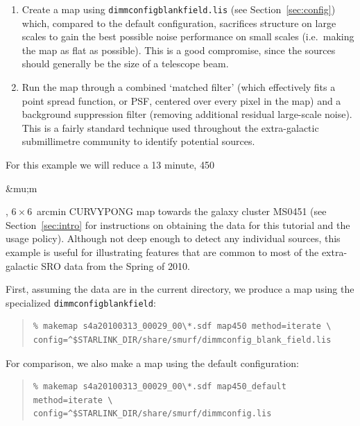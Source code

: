 \documentclass[twoside,11pt]{article}
\newcommand{\micron}{\mbox{\,${\umu}$m}}            %
\renewcommand{\_}{\texttt{\symbol{95}}}
\newenvironment{myquote}{\begin{quote}\begin{small}}{\end{small}\end{quote}}
\renewcommand{\micron}{\begin{rawhtml}&mu;m\end{rawhtml}}
\begin{document}
\begin{enumerate}

\item Create a map using \texttt{dimmconfig\_blank\_field.lis} (see
  Section~\ref{sec:config}) which, compared to the default
  configuration, sacrifices structure on large scales to gain the best
  possible noise performance on small scales (i.e.~making the map as
  flat as possible). This is a good compromise, since the sources
  should generally be the size of a telescope beam.

\item Run the map through a combined `matched filter' (which
  effectively fits a point spread function, or PSF, centered over
  every pixel in the map) and a background suppression filter
  (removing additional residual large-scale noise). This is a fairly
  standard technique used throughout the extra-galactic submillimetre
  community to identify potential sources.

\end{enumerate}

For this example we will reduce a 13 minute, 450\micron, $6 \times
6$~arcmin CURVY\_PONG map towards the galaxy cluster MS0451 (see
Section~\ref{sec:intro} for instructions on obtaining the data for
this tutorial and the usage policy). Although not deep enough to
detect any individual sources, this example is useful for illustrating
features that are common to most of the extra-galactic SRO data from
the Spring of 2010.

First, assuming the data are in the current directory, we produce a
map using the specialized \texttt{dimmconfig\_blank\_field}:

\begin{myquote}
\begin{verbatim}
% makemap s4a20100313_00029_00\*.sdf map450 method=iterate \
config=^$STARLINK_DIR/share/smurf/dimmconfig_blank_field.lis
\end{verbatim}
\end{myquote}

For comparison, we also make a map using the default configuration:

\begin{myquote}
\begin{verbatim}
% makemap s4a20100313_00029_00\*.sdf map450_default method=iterate \
config=^$STARLINK_DIR/share/smurf/dimmconfig.lis
\end{verbatim}
\end{myquote}
\end{document}
